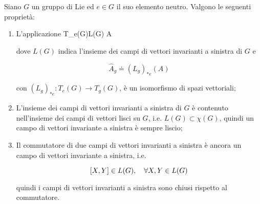 \begin{theorem}
	Siano $ G $ un gruppo di Lie ed $ e \in G $ il suo elemento neutro. Valgono le seguenti proprietà:
	
	\begin{enumerate}
		\item L'applicazione
		\map{\hatapp}
			{T_{e}(G)}{L(G)}
			{A}{}
			
		dove $ L(G) $ indica l'insieme dei campi di vettori invarianti a sinistra di $ G $ e
		
		\begin{equation}
			\hat{A}_{g} \doteq (L_{g})_{*e}(A)
		\end{equation}
	
		con $ (L_{g})_{*e} : T_{e}(G) \to T_{g}(G) $, è un isomorfismo di spazi vettoriali;
		
		\item L'insieme dei campi di vettori invarianti a sinistra di $ G $ è contenuto nell'insieme dei campi di vettori lisci su $ G $, i.e. $ L(G) \subset \chi(G) $, quindi un campo di vettori invariante a sinistra è sempre liscio;
		
		\item Il commutatore di due campi di vettori invarianti a sinistra è ancora un campo di vettori invariante a sinistra, i.e.
		
		\begin{equation}
			\comm{X}{Y} \in L(G) \qcomma \forall X,Y \in L(G)
		\end{equation}
	
		quindi i campi di vettori invarianti a sinistra sono chiusi rispetto al commutatore.
	\end{enumerate}
\end{theorem}

